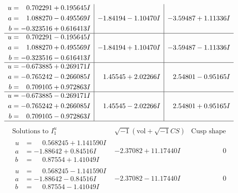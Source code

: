 \documentclass[1p]{elsarticle_modified}
\theoremstyle{definition}
\newcommand{\I}{\sqrt{-1}}
\begin{document}
$$\begin{array}{c|c|c}
\begin{aligned}
u &= \phantom{-}0.702291 + 0.195645 I \\
a &= \phantom{-}1.088270 - 0.495569 I \\
b &= -0.323516 + 0.616413 I\end{aligned}
 & -1.84194 - 1.10470 I & -3.59487 + 1.11336 I \\ \hline\begin{aligned}
u &= \phantom{-}0.702291 - 0.195645 I \\
a &= \phantom{-}1.088270 + 0.495569 I \\
b &= -0.323516 - 0.616413 I\end{aligned}
 & -1.84194 + 1.10470 I & -3.59487 - 1.11336 I \\ \hline\begin{aligned}
u &= -0.673885 + 0.269171 I \\
a &= -0.765242 - 0.266085 I \\
b &= \phantom{-}0.709105 + 0.972863 I\end{aligned}
 & \phantom{-}1.45545 + 2.02266 I & \phantom{-}2.54801 - 0.95165 I \\ \hline\begin{aligned}
u &= -0.673885 - 0.269171 I \\
a &= -0.765242 + 0.266085 I \\
b &= \phantom{-}0.709105 - 0.972863 I\end{aligned}
 & \phantom{-}1.45545 - 2.02266 I & \phantom{-}2.54801 + 0.95165 I\\
 \hline 
 \end{array}$$\newpage$$\begin{array}{c|c|c}  
\text{Solutions to }I^u_{1}& \I (\text{vol} + \sqrt{-1}CS) & \text{Cusp shape}\\
 \hline 
\begin{aligned}
u &= \phantom{-}0.568245 + 1.141590 I \\
a &= -1.88642 + 0.84516 I \\
b &= \phantom{-}0.87554 + 1.41049 I\end{aligned}
 & -2.37082 + 11.17440 I & \phantom{-0.000000 } 0 \\ \hline\begin{aligned}
u &= \phantom{-}0.568245 - 1.141590 I \\
a &= -1.88642 - 0.84516 I \\
b &= \phantom{-}0.87554 - 1.41049 I\end{aligned}
 & -2.37082 - 11.17440 I & \phantom{-0.000000 } 0 \\ \hline\begin{aligned}

\end{aligned}
\end{array}$$
\end{document}
